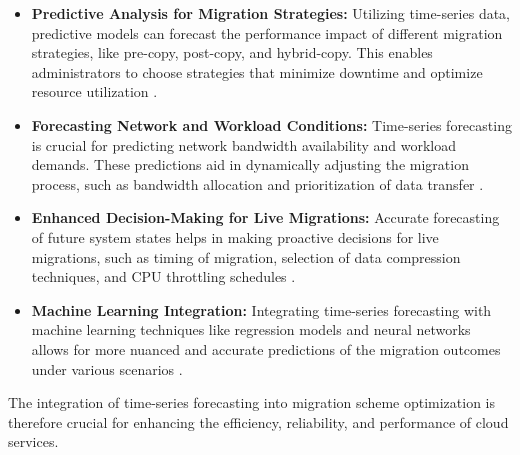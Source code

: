 \begin{itemize}
    \item \textbf{Predictive Analysis for Migration Strategies:} Utilizing time-series data, predictive models can forecast the performance impact of different migration strategies, like pre-copy, post-copy, and hybrid-copy. This enables administrators to choose strategies that minimize downtime and optimize resource utilization \cite{220,224}.
    
    \item \textbf{Forecasting Network and Workload Conditions:} Time-series forecasting is crucial for predicting network bandwidth availability and workload demands. These predictions aid in dynamically adjusting the migration process, such as bandwidth allocation and prioritization of data transfer \cite{229}.
    
    \item \textbf{Enhanced Decision-Making for Live Migrations:} Accurate forecasting of future system states helps in making proactive decisions for live migrations, such as timing of migration, selection of data compression techniques, and CPU throttling schedules \cite{218,219}.
    
    \item \textbf{Machine Learning Integration:} Integrating time-series forecasting with machine learning techniques like regression models and neural networks allows for more nuanced and accurate predictions of the migration outcomes under various scenarios \cite{221,222}.
\end{itemize}

The integration of time-series forecasting into migration scheme optimization is therefore crucial for enhancing the efficiency, reliability, and performance of cloud services.
